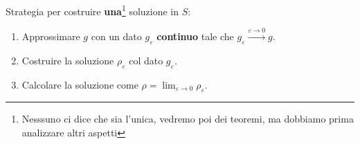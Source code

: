Strategia per costruire \textbf{una}\footnote{Nesssuno ci dice che sia l'unica, vedremo poi dei teoremi, ma dobbiamo prima analizzare altri aspetti} soluzione in $S$:
\begin{enumerate}
    \item Approssimare $g$ con un dato $g_{\varepsilon }$ \textbf{continuo} tale che $g_{\varepsilon }\xrightarrow{\varepsilon \rightarrow 0} g$.
    \item Costruire la soluzione $\rho _{\varepsilon }$ col dato $g_{\varepsilon }$.
    \item Calcolare la soluzione come $\rho =\lim _{\varepsilon \rightarrow 0} \rho _{\varepsilon }$.
\end{enumerate}


